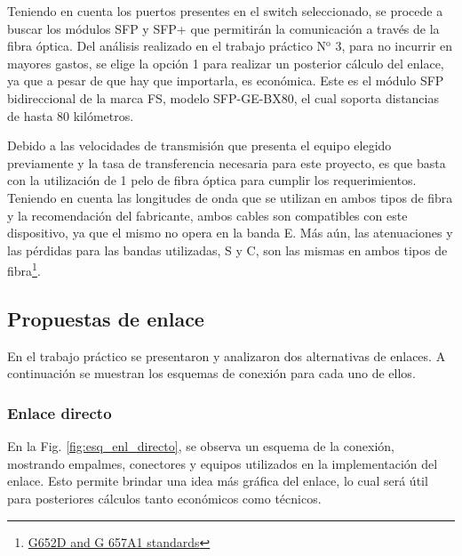\documentclass[11pt,a4paper]{article}
\begin{document}
Teniendo en cuenta los puertos presentes en el switch seleccionado, se procede a buscar los módulos SFP y SFP+ que permitirán la comunicación a través de la fibra óptica.  
Del análisis realizado en el trabajo práctico N$^\text{{o}}$ 3, para no incurrir en mayores gastos, se elige la opción 1 para realizar un posterior cálculo del enlace, ya que a pesar de que hay que importarla, es económica. 
Este es el módulo SFP bidireccional de la marca FS, modelo SFP-GE-BX80, el cual soporta distancias de hasta 80 kilómetros.


Debido a las velocidades de transmisión que presenta el equipo elegido previamente y la tasa de transferencia necesaria para este proyecto, es que basta con la utilización de 1 pelo de fibra óptica para cumplir los requerimientos. 
Teniendo en cuenta las longitudes de onda que se utilizan en ambos tipos de fibra y la recomendación del fabricante, ambos cables son compatibles con este dispositivo, ya que el mismo no opera en la banda E. 
Más aún, las atenuaciones y las pérdidas para las bandas utilizadas, S y C, son las mismas en ambos tipos de fibra\footnote{\href{https://www.belden.com/blogs/reusing-singlemode-fiber-here-s-what-the-g-652d-and-g-657a1-standards-have-to-say\ }{G652D and G 657A1 standards}}.


\subsection{Propuestas de enlace}

En el trabajo práctico se presentaron y analizaron dos alternativas de enlaces. 
A continuación se muestran los esquemas de conexión para cada uno de ellos.

\subsubsection{Enlace directo}
\label{section:enl_dir}

En la Fig. \ref{fig:esq_enl_directo}, se observa un esquema de la conexión, mostrando empalmes, conectores y equipos utilizados en la implementación del enlace. 
Esto permite brindar una idea más gráfica del enlace, lo cual será útil para posteriores cálculos tanto económicos como técnicos.
\end{document}
